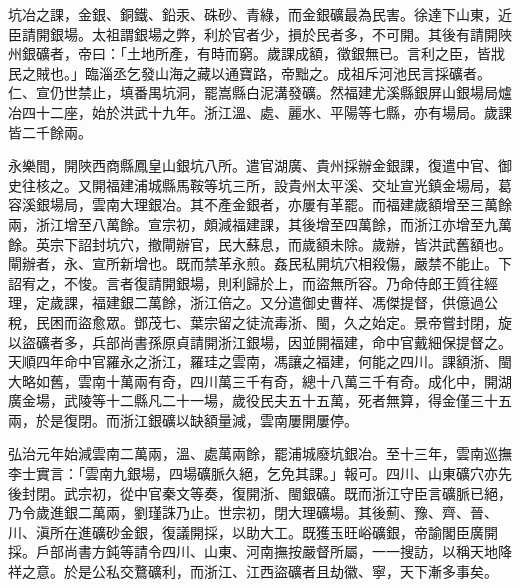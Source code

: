 坑冶之課，金銀、銅鐵、鉛汞、硃砂、青綠，而金銀礦最為民害。徐達下山東，近臣請開銀場。太祖謂銀場之弊，利於官者少，損於民者多，不可開。其後有請開陜州銀礦者，帝曰：「土地所產，有時而窮。歲課成額，徵銀無已。言利之臣，皆戕民之賊也。」臨淄丞乞發山海之藏以通寶路，帝黜之。成祖斥河池民言採礦者。仁、宣仍世禁止，填番禺坑洞，罷嵩縣白泥溝發礦。然福建尤溪縣銀屏山銀場局爐冶四十二座，始於洪武十九年。浙江溫、處、麗水、平陽等七縣，亦有場局。歲課皆二千餘兩。

永樂間，開陜西商縣鳳皇山銀坑八所。遣官湖廣、貴州採辦金銀課，復遣中官、御史往核之。又開福建浦城縣馬鞍等坑三所，設貴州太平溪、交址宣光鎮金場局，葛容溪銀場局，雲南大理銀冶。其不產金銀者，亦屢有革罷。而福建歲額增至三萬餘兩，浙江增至八萬餘。宣宗初，頗減福建課，其後增至四萬餘，而浙江亦增至九萬餘。英宗下詔封坑穴，撤閘辦官，民大蘇息，而歲額未除。歲辦，皆洪武舊額也。閘辦者，永、宣所新增也。既而禁革永煎。姦民私開坑穴相殺傷，嚴禁不能止。下詔宥之，不悛。言者復請開銀場，則利歸於上，而盜無所容。乃命侍郎王質往經理，定歲課，福建銀二萬餘，浙江倍之。又分遣御史曹祥、馮傑提督，供億過公稅，民困而盜愈眾。鄧茂七、葉宗留之徒流毒浙、閩，久之始定。景帝嘗封閉，旋以盜礦者多，兵部尚書孫原貞請開浙江銀場，因並開福建，命中官戴細保提督之。天順四年命中官羅永之浙江，羅珪之雲南，馮讓之福建，何能之四川。課額浙、閩大略如舊，雲南十萬兩有奇，四川萬三千有奇，總十八萬三千有奇。成化中，開湖廣金場，武陵等十二縣凡二十一場，歲役民夫五十五萬，死者無算，得金僅三十五兩，於是復閉。而浙江銀礦以缺額量減，雲南屢開屢停。

弘治元年始減雲南二萬兩，溫、處萬兩餘，罷浦城廢坑銀冶。至十三年，雲南巡撫李士實言：「雲南九銀場，四場礦脈久絕，乞免其課。」報可。四川、山東礦穴亦先後封閉。武宗初，從中官秦文等奏，復開浙、閩銀礦。既而浙江守臣言礦脈已絕，乃令歲進銀二萬兩，劉瑾誅乃止。世宗初，閉大理礦場。其後薊、豫、齊、晉、川、滇所在進礦砂金銀，復議開採，以助大工。既獲玉旺峪礦銀，帝諭閣臣廣開採。戶部尚書方鈍等請令四川、山東、河南撫按嚴督所屬，一一搜訪，以稱天地降祥之意。於是公私交鶩礦利，而浙江、江西盜礦者且劫徽、寧，天下漸多事矣。

